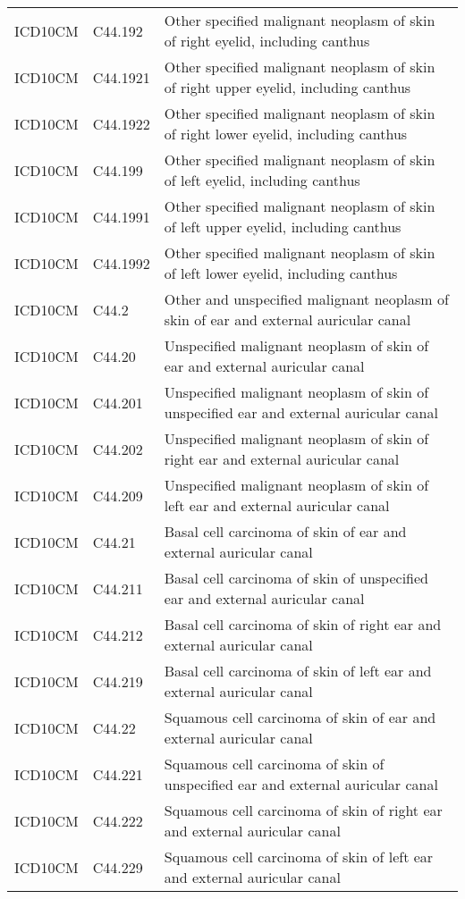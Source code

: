 \begin{longtable}{p{}p{}p{}}
  ICD10CM & C44.192 & Other specified malignant neoplasm of skin of right eyelid, including canthus \\ 
  ICD10CM & C44.1921 & Other specified malignant neoplasm of skin of right upper eyelid, including canthus \\ 
  ICD10CM & C44.1922 & Other specified malignant neoplasm of skin of right lower eyelid, including canthus \\ 
  ICD10CM & C44.199 & Other specified malignant neoplasm of skin of left eyelid, including canthus \\ 
  ICD10CM & C44.1991 & Other specified malignant neoplasm of skin of left upper eyelid, including canthus \\ 
  ICD10CM & C44.1992 & Other specified malignant neoplasm of skin of left lower eyelid, including canthus \\ 
  ICD10CM & C44.2 & Other and unspecified malignant neoplasm of skin of ear and external auricular canal \\ 
  ICD10CM & C44.20 & Unspecified malignant neoplasm of skin of ear and external auricular canal \\ 
  ICD10CM & C44.201 & Unspecified malignant neoplasm of skin of unspecified ear and external auricular canal \\ 
  ICD10CM & C44.202 & Unspecified malignant neoplasm of skin of right ear and external auricular canal \\ 
  ICD10CM & C44.209 & Unspecified malignant neoplasm of skin of left ear and external auricular canal \\ 
  ICD10CM & C44.21 & Basal cell carcinoma of skin of ear and external auricular canal \\ 
  ICD10CM & C44.211 & Basal cell carcinoma of skin of unspecified ear and external auricular canal \\ 
  ICD10CM & C44.212 & Basal cell carcinoma of skin of right ear and external auricular canal \\ 
  ICD10CM & C44.219 & Basal cell carcinoma of skin of left ear and external auricular canal \\ 
  ICD10CM & C44.22 & Squamous cell carcinoma of skin of ear and external auricular canal \\ 
  ICD10CM & C44.221 & Squamous cell carcinoma of skin of unspecified ear and external auricular canal \\ 
  ICD10CM & C44.222 & Squamous cell carcinoma of skin of right ear and external auricular canal \\ 
  ICD10CM & C44.229 & Squamous cell carcinoma of skin of left ear and external auricular canal \\ 

\end{longtable}
